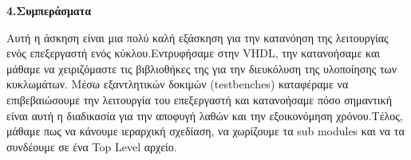 \vspace{1cm}
{ \large \bfseries 4.Συμπεράσματα}\\ %

\begin{justify}
    Αυτή η άσκηση είναι μια πολύ καλή εξάσκηση
    για την κατανόηση της λειτουργίας ενός επεξεργαστή
    ενός κύκλου.Εντρυφήσαμε στην \textlatin{VHDL}, την κατανοήσαμε
    και μάθαμε να χειριζόμαστε τις βιβλιοθήκες της για την
    διευκόλυση της υλοποίησης των κυκλωμάτων. Μέσω εξαντλητικών
    δοκιμών (\textlatin{testbenches}) καταφέραμε να επιβεβαιώσουμε την λειτουργία του επεξεργαστή
    και κατανοήσαμε πόσο σημαντική είναι αυτή η διαδικασία
    για την αποφυγή λαθών και την εξοικονόμηση χρόνου.Τέλος,
    μάθαμε πως να κάνουμε ιεραρχική σχεδίαση, να χωρίζουμε
    τα \textlatin{sub modules} και να τα συνδέουμε σε ένα
    \textlatin{Top Level} αρχείο.
\end{justify}